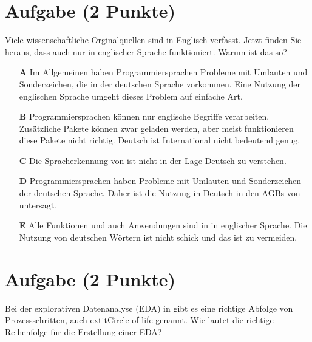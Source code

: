 \documentclass[a4paper, 9pt]{scrartcl}\usepackage[]{graphicx}\usepackage[]{xcolor}
\begin{document}
\section{Aufgabe \hfill (2 Punkte)}



Viele wissenschaftliche Orginalquellen sind in Englisch verfasst. Jetzt finden Sie heraus, dass auch \Rlogo nur in englischer Sprache funktioniert. Warum ist das so?



\begin{enumerate}
\item [\textbf{A} \msquare] Im Allgemeinen haben Programmiersprachen Probleme mit Umlauten und Sonderzeichen, die in der deutschen Sprache vorkommen. Eine Nutzung der englischen Sprache umgeht dieses Problem auf einfache Art.
\item [\textbf{B} \msquare] Programmiersprachen können nur englische Begriffe verarbeiten. Zusätzliche Pakete können zwar geladen werden, aber meist funktionieren diese Pakete nicht richtig. Deutsch ist International nicht bedeutend genug.
\item [\textbf{C} \msquare] Die Spracherkennung von \Rlogo ist nicht in der Lage Deutsch zu verstehen.
\item [\textbf{D} \msquare] Programmiersprachen haben Probleme mit Umlauten und Sonderzeichen der deutschen Sprache. Daher ist die Nutzung in Deutsch in den AGBs von \Rlogo untersagt.
\item [\textbf{E} \msquare] Alle Funktionen und auch Anwendungen sind in \Rlogo in englischer Sprache. Die Nutzung von deutschen Wörtern ist nicht schick und das ist zu vermeiden.
\end{enumerate}

\section{Aufgabe \hfill (2 Punkte)}



Bei der explorativen Datenanalyse (EDA) in \Rlogo gibt es eine richtige Abfolge von Prozessschritten, auch 	extit{Circle of life} genannt. Wie lautet die richtige Reihenfolge für die Erstellung einer EDA?
\end{document}
